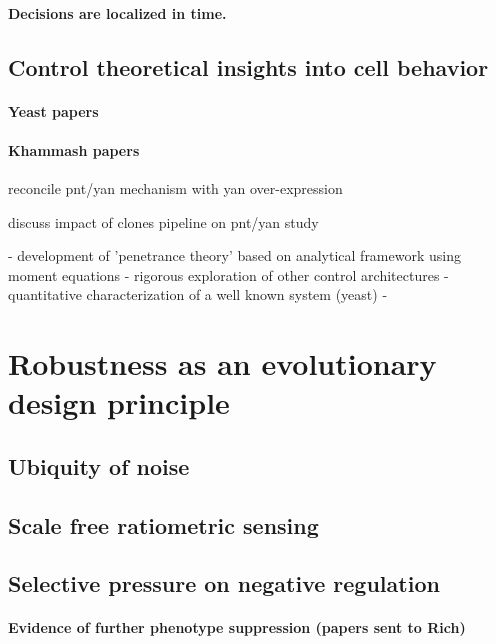 		\paragraph{Decisions are localized in time.}
	\subsection{Control theoretical insights into cell behavior}
		\paragraph{Yeast papers}
		\paragraph{Khammash papers}



reconcile pnt/yan mechanism with yan over-expression

discuss impact of clones pipeline on pnt/yan study


- development of 'penetrance theory' based on analytical framework using moment equations
- rigorous exploration of other control architectures
- quantitative characterization of a well known system (yeast)
- 


\section{Robustness as an evolutionary design principle}

	\subsection{Ubiquity of noise}	
	
	\subsection{Scale free ratiometric sensing}
	
	\subsection{Selective pressure on negative regulation}
	
		\paragraph{Evidence of further phenotype suppression (papers sent to Rich)}

